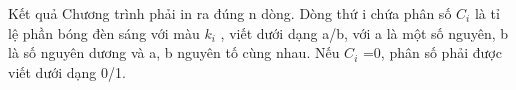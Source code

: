 Kết quả  
Chương trình phải in ra đúng n dòng. Dòng thứ i chứa phân số $C_{i}$   là tỉ lệ phần bóng đèn sáng với màu $k_{i}$   , viết dưới dạng a/b, với a là một số nguyên, b là số nguyên dương và a, b nguyên tố cùng nhau. Nếu $C_{i}$   =0, phân số phải được viết dưới dạng 0/1.